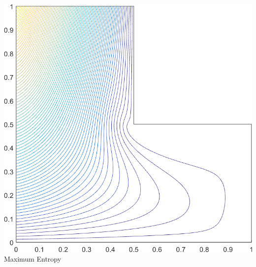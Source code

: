 \documentclass[compress,10pt]{beamer}
\begin{document}
\begin{frame}[t]
{\begin{columns}
{}\includegraphics[width=0.85\columnwidth]{images/L-domain_MAXENT1_contour_b6.png} \\
Maximum Entropy
\end{columns}
}
\end{frame}
\end{document}
